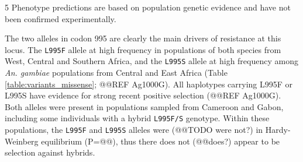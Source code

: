 \documentclass[a4paper,11pt,abstracton]{scrartcl}
\begin{document}
{\begin{landscape}
\begin{table}[h]
\begin{threeparttable}
\begin{tablenotes}
    \item[5] Phenotype predictions are based on population genetic evidence and have not been confirmed experimentally.
    
  \end{tablenotes}
  
  \end{threeparttable}
  
\end{table}
\end{landscape}
} %


%
The two alleles in codon 995 are clearly the main drivers of resistance at this locus.
%
The \texttt{L995F} allele at high frequency in populations of both species from West, Central and Southern Africa, and the \texttt{L995S} allele at high frequency among \textit{An. gambiae} populations from Central and East Africa (Table \ref{table:variants_missense}; @@REF Ag1000G).
%
All haplotypes carrying L995F or L995S have evidence for strong recent positive selection (@@REF Ag1000G).
%
Both alleles were present in populations sampled from Cameroon and Gabon, including some individuals with a hybrid \texttt{L995F/S} genotype. Within these populations, the \texttt{L995F} and \texttt{L995S} alleles were (@@TODO were not?) in Hardy-Weinberg equilibrium (P=@@), thus there does not (@@does?) appear to be selection against hybrids.
\end{document}
